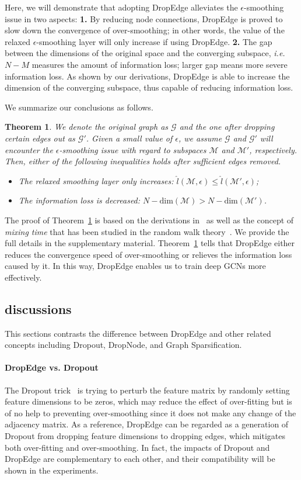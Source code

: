 \documentclass{article}
\newtheorem{theorem}{Theorem}
\def\gG{{\mathcal{G}}}
\def\gM{{\mathcal{M}}}
\begin{document}
Here, we will demonstrate that adopting DropEdge alleviates the $\epsilon$-smoothing issue in two aspects: \textbf{1.} By reducing node connections, DropEdge is proved to slow down the convergence of over-smoothing; in other words, the value of the relaxed $\epsilon$-smoothing layer will only increase if using DropEdge. \textbf{2.} The gap between the dimensions of the original space and the converging subspace, \emph{i.e.} $N-M$ measures the amount of information loss; larger gap means more severe information loss. As shown by our derivations, DropEdge is able to increase the dimension of the converging subspace, thus capable of reducing information loss.

We summarize our conclusions as follows.
\begin{theorem}
\label{The:smoothing}
We denote the original graph as $\gG$ and the one after dropping certain edges out as $\gG'$. Given a small value of $\epsilon$, we assume $\gG$ and $\gG'$ will encounter the $\epsilon$-smoothing issue with regard to subspaces $\gM$ and $\gM'$, respectively. Then, either of the following inequalities holds after sufficient edges removed.
\begin{itemize}
    \item The relaxed smoothing layer only increases: $\hat{l}(\gM, \epsilon)\leq \hat{l}(\gM', \epsilon)$;
    \item The information loss is decreased: $N-\text{dim}(\gM) > N-\text{dim}(\gM')$.
\end{itemize}
\end{theorem}

The proof of Theorem~\ref{The:smoothing} is based on the derivations in~\citet{oono2019asymptotic} as well as the concept of \emph{mixing time} that has been studied in the random walk theory~\citep{Lovasz1993}. We provide the full details in the supplementary material. Theorem~\ref{The:smoothing} tells that DropEdge either reduces the convergence speed of over-smoothing or relieves the information loss caused by it. In this way, DropEdge enables us to train deep GCNs more effectively.


\subsection{discussions}\label{sec.discussions}
This sections contrasts the difference between DropEdge and other related concepts including Dropout, DropNode, and Graph Sparsification.

\paragraph{DropEdge vs. Dropout}
The Dropout trick~\citep{Hinton2012} is trying to perturb the feature matrix by randomly setting feature dimensions to be zeros, which may reduce the effect of over-fitting but is of no help to preventing over-smoothing since it does not make any change of the adjacency matrix. As a reference, DropEdge can be regarded as a generation of Dropout from dropping feature dimensions to dropping edges, which mitigates both over-fitting and over-smoothing. In fact, the impacts of Dropout and DropEdge are complementary to each other, and their compatibility will be shown in the experiments.
\end{document}
